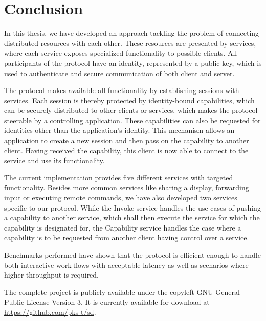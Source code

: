 \chapter{Conclusion}

In this thesis, we have developed an approach tackling the problem of connecting distributed resources with each other.
These resources are presented by services, where each service exposes specialized functionality to possible clients.
All participants of the protocol have an identity, represented by a public key, which is used to authenticate and secure communication of both client and server.

The protocol makes available all functionality by establishing sessions with services.
Each session is thereby protected by identity-bound capabilities, which can be securely distributed to other clients or services, which makes the protocol steerable by a controlling application.
These capabilities can also be requested for identities other than the application's identity.
This mechanism allows an application to create a new session and then pass on the capability to another client.
Having received the capability, this client is now able to connect to the service and use its functionality.

The current implementation provides five different services with targeted functionality.
Besides more common services like sharing a display, forwarding input or executing remote commands, we have also developed two services specific to our protocol.
While the Invoke service handles the use-cases of pushing a capability to another service, which shall then execute the service for which the capability is designated for, the Capability service handles the case where a capability is to be requested from another client having control over a service.

Benchmarks performed have shown that the protocol is efficient enough to handle both interactive work-flows with acceptable latency as well as scenarios where higher throughput is required.

The complete project is publicly available under the copyleft GNU General Public License Version 3.
It is currently available for download at \url{https://github.com/pks-t/sd}.


